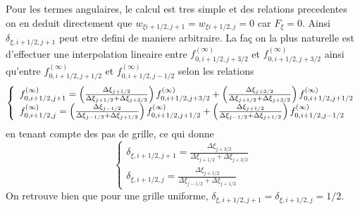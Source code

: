 Pour les termes angulaires, le calcul est tres simple et des relations
precedentes on en deduit directement que $w_{\xi i+1/2,j+1}=w_{\xi i+1/2,j}=0
$ car $F_{\xi}=0$. Ainsi $\delta_{\xi,i+1/2,j+1}$ peut etre defini de
maniere arbitraire. La fa\c{c} on la plus naturelle est d'effectuer une
interpolation lineaire entre $f_{0,i+1/2,j+3/2}^{(\infty)}$ et $%
f_{0,i+1/2,j+3/2}^{(\infty)}$ ainsi qu'entre $f_{0,i+1/2,j+1/2}^{(\infty)}$
et $f_{0,i+1/2,j-1/2}^{(\infty)}$ selon les relations 
\[
\left\{ 
\begin{array}{l}
f_{0,i+1/2,j+1}^{(\infty)}=\left(\frac{\Delta\xi_{j+1/2}}{%
\Delta\xi_{j+1/2}+\Delta\xi_{j+3/2}}\right)f_{0,i+1/2,j+3/2}^{(\infty)}+%
\left(\frac{\Delta\xi_{j+3/2}}{\Delta\xi_{j+1/2}+\Delta\xi_{j+3/2}}%
\right)f_{0,i+1/2,j+1/2}^{(\infty)} \\ 
f_{0,i+1/2,j}^{(\infty)}=\left(\frac{\Delta\xi_{j-1/2}}{\Delta\xi_{j-1/2}+%
\Delta\xi_{j+1/2}}\right)f_{0,i+1/2,j+1/2}^{(\infty)}+\left(\frac{%
\Delta\xi_{j+1/2}}{\Delta\xi_{j-1/2}+\Delta\xi_{j+1/2}}%
\right)f_{0,i+1/2,j-1/2}^{(\infty)}
\end{array}
\right.
\]
en tenant compte des pas de grille, ce qui donne 
\[
\left\{ 
\begin{array}{l}
\delta_{\xi,i+1/2,j+1}=\frac{\Delta\xi_{j+3/2}}{\Delta\xi_{j+1/2}+\Delta%
\xi_{j+3/2}} \\ 
\delta_{\xi,i+1/2,j}=\frac{\Delta\xi_{j+1/2}}{\Delta\xi_{j-1/2}+\Delta%
\xi_{j+1/2}}
\end{array}
\right.
\]
On retrouve bien que pour une grille uniforme, $\delta_{\xi,i+1/2,j+1}=%
\delta_{\xi,i+1/2,j}=1/2.$

